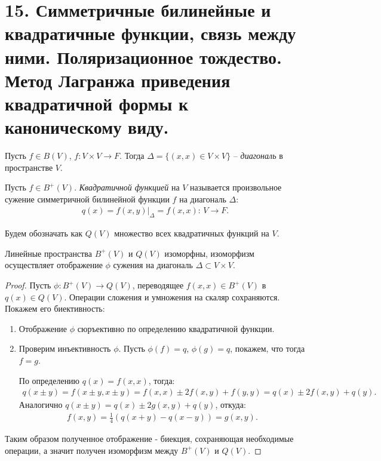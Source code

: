 \section{15. Симметричные билинейные и квадратичные функции, связь между ними. Поляризационное тождество. Метод Лагранжа приведения квадратичной формы к каноническому виду.}

\begin{definition}
    Пусть $f \in B(V)$, $f: V \times V \to F$. Тогда $\Delta = \{(x, x) \in V \times V\}$ -- 
    \textit{диагональ} в пространстве $V$.
\end{definition}

\begin{definition} 
    Пусть $f \in B^{+}(V)$. \textit{Квадратичной функцией} на $V$ называется произвольное сужение симметричной 
    билинейной функции $f$ на диагональ $\Delta$:
    \begin{gather*}
        q(x) = f(x, y) \vert_{\Delta} = f(x, x): \, V \to F.
    \end{gather*} 
\end{definition}

\begin{agreement}
    Будем обозначать как $Q(V)$ множество всех квадратичных функций на $V$.
\end{agreement}

\begin{theorem}
    Линейные пространства $B^+(V)$ и $Q(V)$ изоморфны, изоморфизм осуществляет отображение $\phi$ 
    сужения на диагональ $\Delta \subset V \times V$.
\end{theorem}

\begin{proof}
    Пусть $\phi: B^+(V) \to Q(V)$, переводящее $f(x, x) \in B^+(V)$ в $q(x) \in Q(V)$. 
    Операции сложения и умножения на скаляр сохраняются. Покажем его биективность:
    \begin{enumerate}
        \item Отображение $\phi$ сюръективно по определению квадратичной функции.  
        \item Проверим инъективность $\phi$. Пусть $\phi(f) = q$, $\phi(g) = q$, покажем, что тогда 
        $f = g$. 
        
        По определению $q(x) = f(x, x)$, тогда:
        \begin{gather*}
            q(x \pm y) = f(x \pm y, x \pm y) = f(x, x) \pm 2 f(x, y) + f(y, y) =
            q(x) \pm 2 f(x, y) + q(y).
        \end{gather*}
        Аналогично $q(x \pm y) = q(x) \pm 2 g(x, y) + q(y)$, откуда:
        \begin{gather*}
            f(x, y) = \frac{1}{4} (q(x+y) - q(x-y)) = g(x, y).
        \end{gather*} 
    \end{enumerate} 
    Таким образом полученное отображение - биекция, сохраняющая необходимые операции, а значит 
    получен изоморфизм между $B^+(V)$ и $Q(V)$.
\end{proof}

